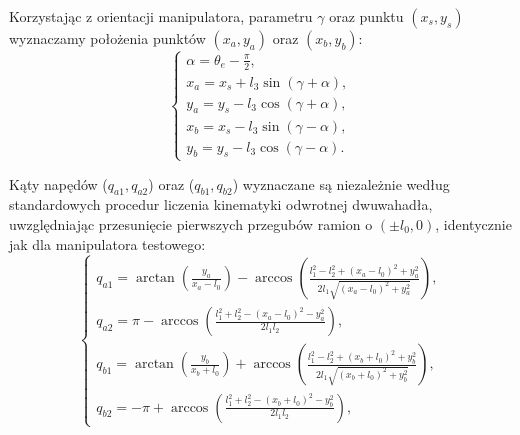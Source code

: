 \documentclass[printmode]{mgr}
\begin{document}
Korzystając z orientacji manipulatora, parametru $\gamma$ oraz punktu $(x_s, y_s)$ wyznaczamy położenia punktów $(x_a, y_a)$ oraz $(x_b, y_b)$:
\begin{equation}
\begin{cases}
\alpha = \theta_e - \frac{\pi}{2}, \\
x_a = x_s + l_3\sin(\gamma + \alpha),\\
y_a = y_s - l_3\cos(\gamma + \alpha),\\
x_b = x_s - l_3\sin(\gamma - \alpha),\\
y_b = y_s - l_3\cos(\gamma - \alpha).
\end{cases}
\label{eq:kinematyka_odwrotna3}
\end{equation}

Kąty napędów ($q_{a1}, q_{a2}$) oraz ($q_{b1}, q_{b2}$)
wyznaczane są niezależnie według standardowych procedur liczenia kinematyki odwrotnej dwuwahadła, uwzględniając przesunięcie pierwszych
przegubów ramion o $(\pm l_0, 0)$, identycznie jak dla manipulatora testowego:
\begin{equation}
\begin{cases}
q_{a1} = \arctan(\frac{y_a}{x_a-l_0})-\arccos(\frac{l_1^2-l_2^2+(x_a-l_0)^2+y_a^2}{2l_1\sqrt{(x_a-l_0)^2+y_a^2}}),\\
q_{a2} = \pi - \arccos(\frac{l_1^2+l_2^2-(x_a-l_0)^2-y_a^2}{2l_1l_2}),\\
q_{b1} = \arctan(\frac{y_b}{x_b+l_0}) + \arccos(\frac{l_1^2-l_2^2+(x_b+l_0)^2+y_b^2}{2l_1\sqrt{(x_b+l_0)^2+y_b^2}}),\\
q_{b2} = -\pi + \arccos(\frac{l_1^2+l_2^2-(x_b+l_0)^2-y_b^2}{2l_1l_2}),
\end{cases}
\label{eq:kinematyka_odwrotna}
\end{equation}
\end{document}
